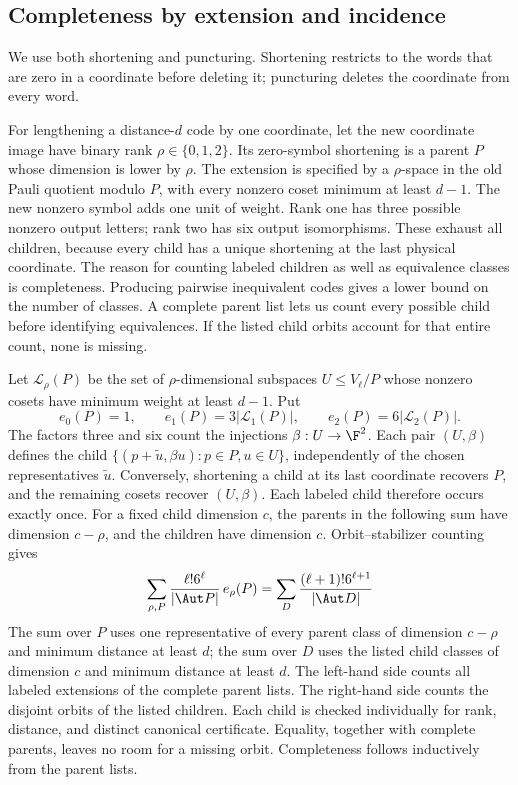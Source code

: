 \subsection{Completeness by extension and incidence}

We use both shortening and puncturing. Shortening restricts to the
words that are zero in a coordinate before deleting it; puncturing
deletes the coordinate from every word.

For lengthening a distance-\(d\) code by one coordinate, let the new
coordinate image have binary rank \(\rho\in\{0,1,2\}\). Its zero-symbol
shortening is a parent \(P\) whose dimension is lower by \(\rho\).
The extension is specified by a \(\rho\)-space in the old Pauli quotient
modulo \(P\), with every nonzero coset minimum at least \(d-1\).
The new nonzero symbol adds one unit of weight. Rank one has three
possible nonzero output letters; rank two has six output isomorphisms.
These exhaust all children, because every child has a unique shortening
at the last physical coordinate.
The reason for counting labeled children as well as equivalence classes
is completeness. Producing pairwise inequivalent codes gives a lower
bound on the number of classes. A complete parent list lets us count
every possible child before identifying equivalences. If the listed
child orbits account for that entire count, none is missing.

Let \(\mathcal L_\rho(P)\) be the set of \(\rho\)-dimensional subspaces
\(U\leq V_\ell/P\) whose nonzero cosets have minimum weight at least
\(d-1\). Put
\[
 e_0(P)=1,\qquad e_1(P)=3|\mathcal L_1(P)|,\qquad
 e_2(P)=6|\mathcal L_2(P)|.
\]
The factors three and six count the injections \(\beta:U\to\F^2\).
Each pair \((U,\beta)\) defines the child
\(\{(p+\widetilde u,\beta u):p\in P,u\in U\}\), independently
of the chosen representatives \(\widetilde u\).
Conversely, shortening a child at its last coordinate recovers \(P\),
and the remaining cosets recover \((U,\beta)\). Each labeled child
therefore occurs exactly once. For a fixed child dimension \(c\), the
parents in the following sum have dimension \(c-\rho\), and the
children have dimension \(c\). Orbit--stabilizer counting gives
\begin{equation}\label{eq:lengthening-mass}
 \sum_{\rho,P}\frac{\ell!6^\ell}{|\Aut P|}\,e_\rho(P)
 =\sum_D\frac{(\ell+1)!6^{\ell+1}}{|\Aut D|}
\end{equation}
The sum over \(P\) uses one representative of every parent class of
dimension \(c-\rho\) and minimum distance at least \(d\); the sum
over \(D\) uses the listed child classes of dimension \(c\) and
minimum distance at least \(d\).
The left-hand side counts all labeled extensions of the complete parent
lists. The right-hand side counts the disjoint orbits of the listed children. Each child is checked individually for rank, distance, and
distinct canonical certificate. Equality, together with complete parents,
leaves no room for a missing orbit. Completeness follows inductively from the parent lists.

